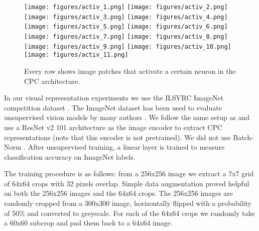 \begin{figure}[t]
  \centering
  \begin{minipage}{1.0\textwidth}
  \texttt{[image: figures/activ\_1.png]}
  \vspace{0.1cm}
  \texttt{[image: figures/activ\_2.png]}
  \vspace{0.1cm}
  \texttt{[image: figures/activ\_3.png]}
  \vspace{0.1cm}
  \texttt{[image: figures/activ\_4.png]}
  \vspace{0.1cm}
  \texttt{[image: figures/activ\_5.png]}
  \vspace{0.1cm}
  \texttt{[image: figures/activ\_6.png]}
  \vspace{0.1cm}
  \texttt{[image: figures/activ\_7.png]}
  \vspace{0.1cm}
  \texttt{[image: figures/activ\_8.png]}
  \vspace{0.1cm}
  \texttt{[image: figures/activ\_9.png]}
  \vspace{0.1cm}
  \texttt{[image: figures/activ\_10.png]}
  \vspace{0.1cm}
  \texttt{[image: figures/activ\_11.png]}
  \caption{Every row shows image patches that activate a certain neuron in the CPC architecture.}
  \label{neuron_activation}
  \end{minipage}
   \vspace{-0.5cm}
\end{figure}

In our visual representation experiments we use the ILSVRC ImageNet competition dataset \cite{ILSVRC15}. The ImageNet dataset has been used to evaluate unsupervised vision models by many authors \cite{wang2015unsupervised, Doersch_2015_ICCV, donahue2016adversarial, zhang2016colorful, noroozi2016unsupervised, doersch2017multi}. We follow the same setup as \cite{doersch2017multi} and use a ResNet v2 101 architecture \cite{he2016identity} as the image encoder  to extract CPC representations (note that this encoder is not pretrained). We did not use Batch-Norm \cite{ioffe2015batch}. After unsupervised training, a linear layer is trained to measure classification accuracy on ImageNet labels.

The training procedure is as follows: from a 256x256 image we extract a 7x7 grid of 64x64 crops with 32 pixels overlap. Simple data augmentation proved helpful on both the 256x256 images and the 64x64 crops. The 256x256 images are randomly cropped from a 300x300 image, horizontally flipped with a probability of 50\% and converted to greyscale. For each of the 64x64 crops we randomly take a 60x60 subcrop and pad them back to a 64x64 image. 

